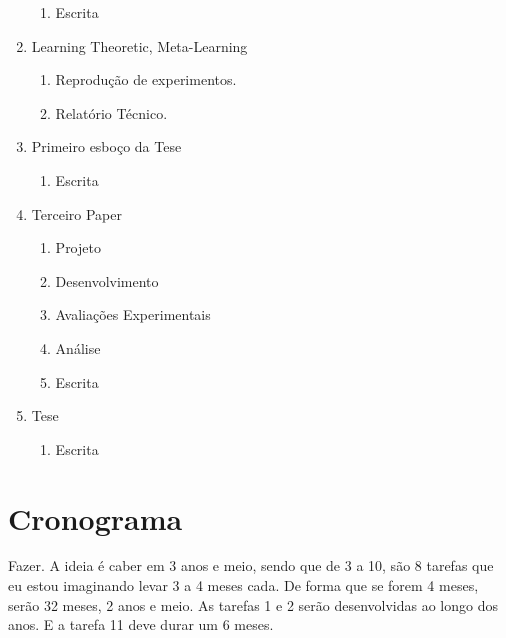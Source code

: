 \documentclass[
12pt, %
a4paper, %
onecolumn, %
]{article}
\begin{document}
\begin{enumerate}
\begin{enumerate}
    \item Escrita
  \end{enumerate}
  \item Learning Theoretic, Meta-Learning
  \begin{enumerate}
    \item Reprodução de experimentos.
    \item Relatório Técnico.
  \end{enumerate}
  \item Primeiro esboço da Tese
  \begin{enumerate}
    \item Escrita
  \end{enumerate}
  \item Terceiro Paper
  \begin{enumerate}
    \item Projeto
    \item Desenvolvimento
    \item Avaliações Experimentais
    \item Análise
    \item Escrita
  \end{enumerate}
  \item Tese
  \begin{enumerate}
    \item Escrita
  \end{enumerate}
\end{enumerate}


\section{Cronograma}

Fazer.  A ideia é caber em 3 anos e meio, sendo que de 3 a 10, são 8 tarefas que eu estou imaginando levar 3 a 4 meses cada. De forma que se forem 4 meses, serão 32 meses, 2 anos e meio. 
As tarefas 1 e 2 serão desenvolvidas ao longo dos anos. E a tarefa 11 deve durar um 6 meses.


%

\renewcommand{\refname}{Bibliografia} %


\end{document}
